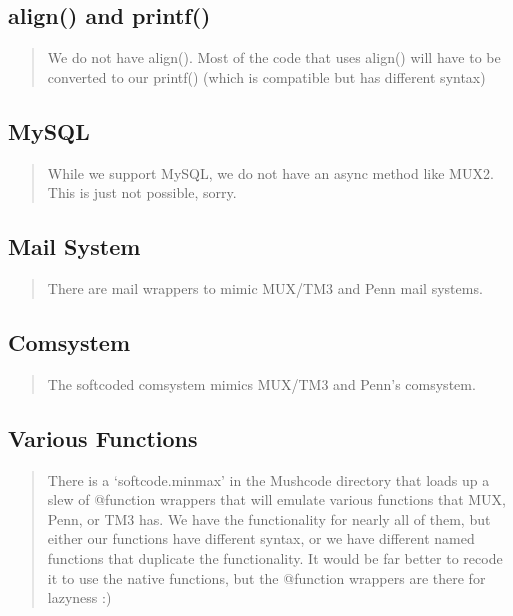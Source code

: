 \documentclass[letterpaper,10pt,english]{sphinxmanual}
\begin{document}
\subsection{align() and printf()}
\label{\detokenize{differences:align-and-printf}}\begin{quote}

\sphinxAtStartPar
We do not have align().  Most of the code that uses align() will have to
be converted to our printf() (which is compatible but has different syntax)
\end{quote}


\subsection{MySQL}
\label{\detokenize{differences:mysql}}\begin{quote}

\sphinxAtStartPar
While we support MySQL, we do not have an async method like MUX2.  This
is just not possible, sorry.
\end{quote}


\subsection{Mail System}
\label{\detokenize{differences:mail-system}}\begin{quote}

\sphinxAtStartPar
There are mail wrappers to mimic MUX/TM3 and Penn mail systems.
\end{quote}


\subsection{Comsystem}
\label{\detokenize{differences:comsystem}}\begin{quote}

\sphinxAtStartPar
The softcoded comsystem mimics MUX/TM3 and Penn’s comsystem.
\end{quote}


\subsection{Various Functions}
\label{\detokenize{differences:various-functions}}\begin{quote}

\sphinxAtStartPar
There is a ‘softcode.minmax’ in the Mushcode directory that loads up a slew
of @function wrappers that will emulate various functions that MUX, Penn, or
TM3 has.  We have the functionality for nearly all of them, but either our
functions have different syntax, or we have different named functions that
duplicate the functionality.  It would be far better to recode it to use
the native functions, but the @function wrappers are there for lazyness :)
\end{quote}
\end{document}
